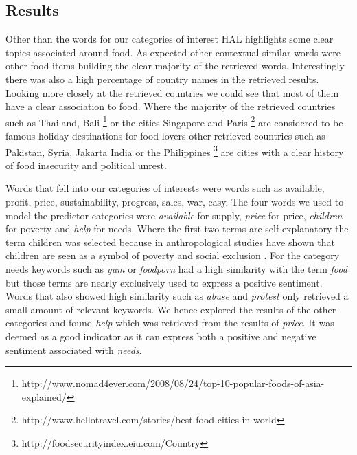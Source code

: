 \subsection{Results  }

Other than the words for our categories of interest HAL highlights some clear topics associated around food. As expected other contextual similar words were other food items building the clear majority of the retrieved words. Interestingly there was also a high percentage of country names in the retrieved results. Looking more closely at the retrieved countries we could see that most of them have a clear association to food. Where the majority of the retrieved countries such as Thailand, Bali \footnote{http://www.nomad4ever.com/2008/08/24/top-10-popular-foods-of-asia-explained/} or the cities Singapore and Paris \footnote{http://www.hellotravel.com/stories/best-food-cities-in-world} are considered to be famous holiday destinations for food lovers other retrieved countries such as Pakistan, Syria, Jakarta India or the Philippines \footnote{http://foodsecurityindex.eiu.com/Country} are cities with a clear history of food insecurity and political unrest. 

Words that fell into our categories of interests were words such as available, profit, price, sustainability, progress, sales,  war, easy. The four words we used to model the predictor categories were \emph{available} for supply, \emph{price} for price, \emph{children} for poverty and \emph{help} for needs. Where the first two terms are self explanatory the term children was selected because in \cite{brick02} anthropological studies have shown that children are seen as a symbol of poverty and social exclusion . For the category needs keywords such as \emph{yum} or \emph{foodporn} had a high similarity with the term \emph{food} but those terms are nearly exclusively used to express a positive sentiment. Words that also showed high similarity such as \emph{abuse} and \emph{protest} only retrieved a small amount of relevant keywords. We hence explored the results of the other categories and found \emph{help} which was retrieved from the results of \emph{ price}. It was deemed as a good indicator as it can express both a positive and negative sentiment associated with \emph{needs}.

